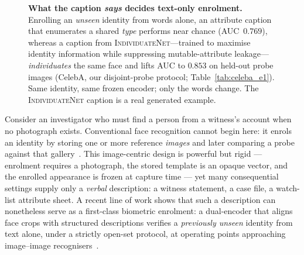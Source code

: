 \documentclass[10pt,twocolumn,letterpaper]{article}
\newcommand{\method}{\textsc{IndividuateNet}}
\begin{document}
\begin{figure}[t]
  \centering
  \caption{\textbf{What the caption \emph{says} decides text-only enrolment.} Enrolling an
  \emph{unseen} identity from words alone, an attribute caption that enumerates a shared
  \emph{type} performs near chance (AUC~$0.769$), whereas a caption from \method{}---trained to
  maximise identity information while suppressing mutable-attribute leakage---\emph{individuates}
  the same face and lifts AUC to $0.853$ on held-out probe images (CelebA, our disjoint-probe
  protocol; Table~\ref{tab:celeba_e1}). Same identity, same frozen encoder; only the words
  change. The \method{} caption is a real generated example.}
  \label{fig:teaser}
\end{figure}

Consider an investigator who must find a person from a witness's account when no photograph
exists. Conventional face recognition cannot begin here: it enrols an identity by storing one or
more reference \emph{images} and later comparing a probe against that
gallery~\cite{arcface,facenet}. This image-centric design is powerful but rigid --- enrolment
requires a photograph, the stored template is an opaque vector, and the enrolled appearance is
frozen at capture time --- yet many consequential settings supply only a \emph{verbal}
description: a witness statement, a case file, a watch-list attribute sheet. A recent line of
work shows that such a description can nonetheless serve as a first-class biometric enrolment: a
dual-encoder that aligns face crops with structured descriptions verifies a \emph{previously
unseen} identity from text alone, under a strictly open-set protocol, at operating points
approaching image--image recognisers~\cite{semanticbio}.
\end{document}
